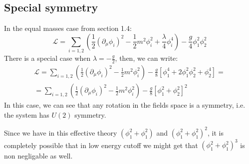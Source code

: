 \documentclass{article}
\begin{document}
\subsection{Special symmetry}
In the equal masses case from section 1.4:
\begin{equation}
    \mathcal{L} = \sum_{i=1,2}\left(
        \frac{1}{2}\left(\partial_\mu\phi_i\right)^2 - \frac{1}{2}m^2\phi_i^2
        + \frac{\lambda}{4}\phi_i^4
    \right) - \frac{g}{4}\phi_1^2\phi_2^2
\end{equation}
There is a special case when $\lambda = -\frac{g}{2}$, then, we can write:
\begin{equation}
\begin{gathered}
    \mathcal{L} = \sum_{i=1,2}\left(
        \frac{1}{2}\left(\partial_\mu\phi_i\right)^2 - \frac{1}{2}m^2\phi_i^2
    \right) - \frac{g}{8}\left[\phi_1^4 + 2\phi_1^2\phi_2^2 + \phi_2^4\right] = \\ =
    \sum_{i=1,2}\left(
        \frac{1}{2}\left(\partial_\mu\phi_i\right)^2 - \frac{1}{2}m^2\phi_i^2
    \right) - \frac{g}{8}\left[\phi_1^2 + \phi_2^2\right]^2
\end{gathered}
\end{equation}
In this case, we can see that any rotation in the fields space is a symmetry, i.e. the system has $U(2)$ symmetry.
\newline

\newline
Since we have in this effective theory $(\phi_1^2 + \phi_1^2)$ and $(\phi_1^2 + \phi_1^2)^2$, it is completely possible that in low energy cutoff we might get that $(\phi_1^2 + \phi_1^2)^3$ is non negligable as well.
\end{document}
